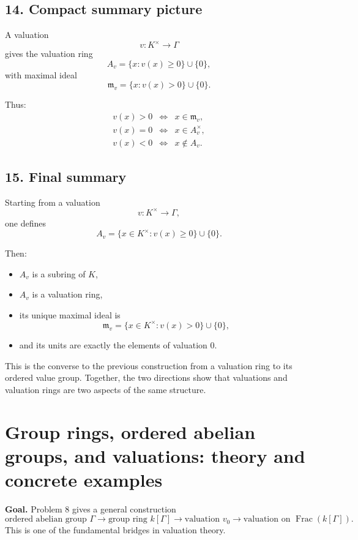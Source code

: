 \documentclass[12pt,a4paper]{article}
\theoremstyle{notespace}
\DeclareMathOperator{\Frac}{Frac}
\begin{document}
\subsection{14. Compact summary picture}

A valuation
\[
v:K^\times\to \Gamma
\]
gives the valuation ring
\[
A_v=\{x:v(x)\ge 0\}\cup\{0\},
\]
with maximal ideal
\[
\mathfrak m_v=\{x:v(x)>0\}\cup\{0\}.
\]

Thus:
\[
\begin{array}{ccl}
	v(x)>0 &\Longleftrightarrow& x\in \mathfrak m_v,\\[1mm]
	v(x)=0 &\Longleftrightarrow& x\in A_v^\times,\\[1mm]
	v(x)<0 &\Longleftrightarrow& x\notin A_v.
\end{array}
\]

\subsection{15. Final summary}

Starting from a valuation
\[
v:K^\times\to \Gamma,
\]
one defines
\[
A_v=\{x\in K^\times : v(x)\ge 0\}\cup\{0\}.
\]

Then:
\begin{itemize}
	\item \(A_v\) is a subring of \(K\),
	\item \(A_v\) is a valuation ring,
	\item its unique maximal ideal is
	\[
	\mathfrak m_v=\{x\in K^\times : v(x)>0\}\cup\{0\},
	\]
	\item and its units are exactly the elements of valuation \(0\).
\end{itemize}

This is the converse to the previous construction from a valuation ring to its ordered value group. Together, the two directions show that valuations and valuation rings are two aspects of the same structure.

\section{Group rings, ordered abelian groups, and valuations: theory and concrete examples}

\textbf{Goal.}
Problem 8 gives a general construction
\[
\text{ordered abelian group } \Gamma
\longrightarrow
\text{group ring } k[\Gamma]
\longrightarrow
\text{valuation } v_0
\longrightarrow
\text{valuation on } \Frac(k[\Gamma]).
\]
This is one of the fundamental bridges in valuation theory.
\end{document}
